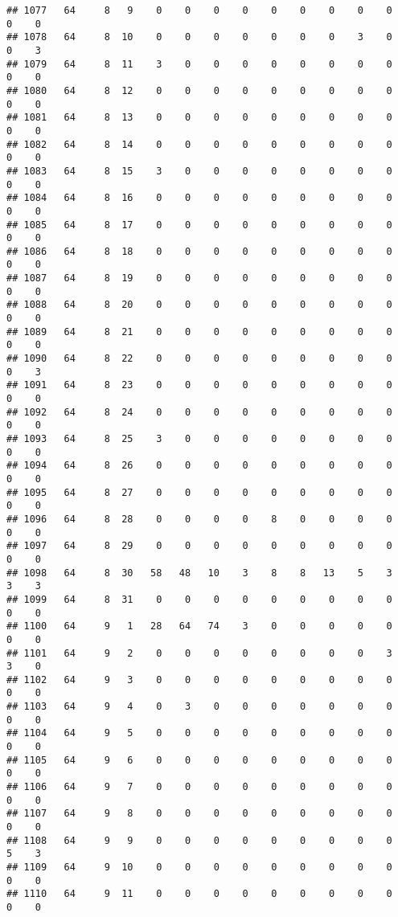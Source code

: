 \documentclass[]{article}
\begin{document}
\begin{verbatim}
## 1077   64     8   9    0    0    0    0    0    0    0    0    0    0    0
## 1078   64     8  10    0    0    0    0    0    0    0    3    0    0    3
## 1079   64     8  11    3    0    0    0    0    0    0    0    0    0    0
## 1080   64     8  12    0    0    0    0    0    0    0    0    0    0    0
## 1081   64     8  13    0    0    0    0    0    0    0    0    0    0    0
## 1082   64     8  14    0    0    0    0    0    0    0    0    0    0    0
## 1083   64     8  15    3    0    0    0    0    0    0    0    0    0    0
## 1084   64     8  16    0    0    0    0    0    0    0    0    0    0    0
## 1085   64     8  17    0    0    0    0    0    0    0    0    0    0    0
## 1086   64     8  18    0    0    0    0    0    0    0    0    0    0    0
## 1087   64     8  19    0    0    0    0    0    0    0    0    0    0    0
## 1088   64     8  20    0    0    0    0    0    0    0    0    0    0    0
## 1089   64     8  21    0    0    0    0    0    0    0    0    0    0    0
## 1090   64     8  22    0    0    0    0    0    0    0    0    0    0    3
## 1091   64     8  23    0    0    0    0    0    0    0    0    0    0    0
## 1092   64     8  24    0    0    0    0    0    0    0    0    0    0    0
## 1093   64     8  25    3    0    0    0    0    0    0    0    0    0    0
## 1094   64     8  26    0    0    0    0    0    0    0    0    0    0    0
## 1095   64     8  27    0    0    0    0    0    0    0    0    0    0    0
## 1096   64     8  28    0    0    0    0    8    0    0    0    0    0    0
## 1097   64     8  29    0    0    0    0    0    0    0    0    0    0    0
## 1098   64     8  30   58   48   10    3    8    8   13    5    3    3    3
## 1099   64     8  31    0    0    0    0    0    0    0    0    0    0    0
## 1100   64     9   1   28   64   74    3    0    0    0    0    0    0    0
## 1101   64     9   2    0    0    0    0    0    0    0    0    3    3    0
## 1102   64     9   3    0    0    0    0    0    0    0    0    0    0    0
## 1103   64     9   4    0    3    0    0    0    0    0    0    0    0    0
## 1104   64     9   5    0    0    0    0    0    0    0    0    0    0    0
## 1105   64     9   6    0    0    0    0    0    0    0    0    0    0    0
## 1106   64     9   7    0    0    0    0    0    0    0    0    0    0    0
## 1107   64     9   8    0    0    0    0    0    0    0    0    0    0    0
## 1108   64     9   9    0    0    0    0    0    0    0    0    0    5    3
## 1109   64     9  10    0    0    0    0    0    0    0    0    0    0    0
## 1110   64     9  11    0    0    0    0    0    0    0    0    0    0    0

\end{verbatim}
\end{document}

